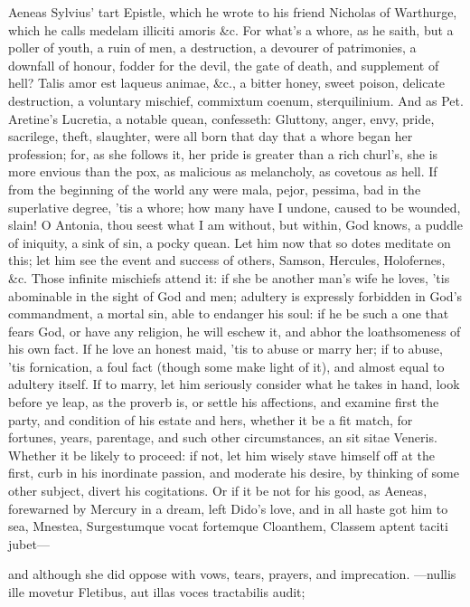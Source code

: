 {Aeneas Sylvius' tart Epistle, which he wrote to his friend Nicholas of
Warthurge, which he calls medelam illiciti amoris \&c. For what's
a whore, as he saith, but a poller of youth, a ruin of men, a
destruction, a devourer of patrimonies, a downfall of honour, fodder
for the devil, the gate of death, and supplement of hell? Talis
amor est laqueus animae, \&c., a bitter honey, sweet poison, delicate
destruction, a voluntary mischief, commixtum coenum, sterquilinium. And
as Pet. Aretine's Lucretia, a notable quean, confesseth:
Gluttony, anger, envy, pride, sacrilege, theft, slaughter, were all
born that day that a whore began her profession; for, as she follows
it, her pride is greater than a rich churl's, she is more envious than
the pox, as malicious as melancholy, as covetous as hell. If from the
beginning of the world any were mala, pejor, pessima, bad in the
superlative degree, 'tis a whore; how many have I undone, caused to be
wounded, slain! O Antonia, thou seest what I am without, but
within, God knows, a puddle of iniquity, a sink of sin, a pocky quean.
Let him now that so dotes meditate on this; let him see the event and
success of others, Samson, Hercules, Holofernes, \&c. Those infinite
mischiefs attend it: if she be another man's wife he loves, 'tis
abominable in the sight of God and men; adultery is expressly forbidden
in God's commandment, a mortal sin, able to endanger his soul: if he be
such a one that fears God, or have any religion, he will eschew it, and
abhor the loathsomeness of his own fact. If he love an honest maid,
'tis to abuse or marry her; if to abuse, 'tis fornication, a foul fact
(though some make light of it), and almost equal to adultery itself. If
to marry, let him seriously consider what he takes in hand, look before
ye leap, as the proverb is, or settle his affections, and examine first
the party, and condition of his estate and hers, whether it be a fit
match, for fortunes, years, parentage, and such other circumstances, an
sit sitae Veneris. Whether it be likely to proceed: if not, let him
wisely stave himself off at the first, curb in his inordinate passion,
and moderate his desire, by thinking of some other subject, divert his
cogitations. Or if it be not for his good, as Aeneas, forewarned by
Mercury in a dream, left Dido's love, and in all haste got him to sea,
Mnestea, Surgestumque vocat fortemque Cloanthem,
Classem aptent taciti jubet---

and although she did oppose with vows, tears, prayers, and imprecation.
---nullis ille movetur
Fletibus, aut illas voces tractabilis audit;

}
